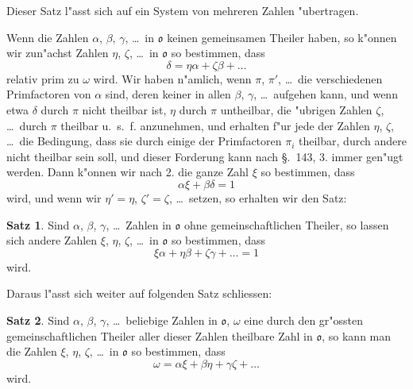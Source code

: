 \documentclass[12pt,a4paper]{article}
\theoremstyle{definition}
\newtheorem*{satz}{Satz}
\begin{document}
Dieser Satz l"asst sich auf ein System von mehreren Zahlen "ubertragen.

Wenn die Zahlen $\alpha$, $\beta$, $\gamma$, \dots\ in $\mathfrak{o}$ keinen gemeinsamen Theiler haben, so k"onnen wir zun"achst Zahlen $\eta$, $\zeta$, \dots\ in $\mathfrak{o}$ so bestimmen, dass
\begin{equation}
\delta = \eta\alpha + \zeta\beta + \dots
\end{equation}
relativ prim zu $\omega$ wird. Wir haben n"amlich, wenn $\pi$, $\pi'$, \dots\ die verschiedenen Primfactoren von $\alpha$ sind, deren keiner in allen $\beta$, $\gamma$, \dots\ aufgehen kann, und wenn etwa $\delta$ durch $\pi$ nicht theilbar ist, $\eta$ durch $\pi$ untheilbar, die "ubrigen Zahlen $\zeta$, \dots\ durch $\pi$ theilbar u.~s.~f. anzunehmen, und erhalten f"ur jede der Zahlen $\eta$, $\zeta$, \dots\ die Bedingung, dass sie durch einige der Primfactoren $\pi_i$ theilbar, durch andere nicht theilbar sein soll, und dieser Forderung kann nach \S.~143, 3. immer gen"ugt werden. Dann k"onnen wir nach 2. die ganze Zahl $\xi$ so bestimmen, dass
\begin{equation}
\alpha\xi + \beta\delta = 1
\end{equation}
wird, und wenn wir $\eta' = \eta$, $\zeta' = \zeta$, \dots\ setzen, so erhalten wir den Satz:

\begin{satz}
Sind $\alpha$, $\beta$, $\gamma$, \dots\ Zahlen in $\mathfrak{o}$ ohne gemeinschaftlichen Theiler, so lassen sich andere Zahlen $\xi$, $\eta$, $\zeta$, \dots\ in $\mathfrak{o}$ so bestimmen, dass
\begin{equation}
\xi\alpha + \eta\beta + \zeta\gamma + \dots = 1
\end{equation}
wird.
\end{satz}

Daraus l"asst sich weiter auf folgenden Satz schliessen:

\begin{satz}
Sind $\alpha$, $\beta$, $\gamma$, \dots\ beliebige Zahlen in $\mathfrak{o}$, $\omega$ eine durch den gr"ossten gemeinschaftlichen Theiler aller dieser Zahlen theilbare Zahl in $\mathfrak{o}$, so kann man die Zahlen $\xi$, $\eta$, $\zeta$, \dots\ in $\mathfrak{o}$ so bestimmen, dass
\begin{equation}
\omega = \alpha\xi + \beta\eta + \gamma\zeta + \dots
\end{equation}
wird.
\end{satz}
\end{document}
